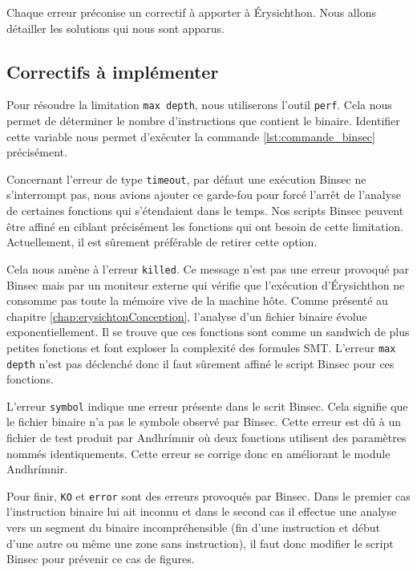 Chaque erreur préconise un correctif à apporter à Érysichthon. Nous allons détailler les solutions qui nous sont apparus.

\subsection*{Correctifs à implémenter}

Pour résoudre la limitation \texttt{max depth}, nous utiliserons l'outil \texttt{perf}. Cela nous permet de déterminer le nombre d'instructions que contient le binaire. Identifier cette variable nous permet d'exécuter la commande \ref{lst:commande_binsec} précisément.\smallbreak

Concernant l'erreur de type \texttt{timeout}, par défaut une exécution Binsec ne s'interrompt pas, nous avions ajouter ce garde-fou pour forcé l'arrêt de l'analyse de certaines fonctions qui s'étendaient dans le temps. Nos scripts Binsec peuvent être affiné en ciblant précisément les fonctions qui ont besoin de cette limitation. Actuellement, il est sûrement préférable de retirer cette option.\smallbreak

Cela nous amène à l'erreur \texttt{killed}. Ce message n'est pas une erreur provoqué par Binsec mais par un moniteur externe qui vérifie que l'exécution d'Érysichthon ne consomme pas toute la mémoire vive de la machine hôte. Comme présenté au chapitre \ref{chap:erysichtonConception}, l'analyse d'un fichier binaire évolue exponentiellement. Il se trouve que ces fonctions sont comme un sandwich de plus petites fonctions et font exploser la complexité des formules SMT. L'erreur \texttt{max depth} n'est pas déclenché donc il faut sûrement affiné le script Binsec pour ces fonctions.

L'erreur \texttt{symbol} indique une erreur présente dans le scrit Binsec. Cela signifie que le fichier binaire n'a pas le symbole observé par Binsec. Cette erreur est dû à un fichier de test produit par Andhrímnir où deux fonctions utilisent des paramètres nommés identiquements. Cette erreur se corrige donc en améliorant le module Andhrímnir.

Pour finir, \texttt{KO} et \texttt{error} sont des erreurs provoqués par Binsec. Dans le premier cas l'instruction binaire lui ait inconnu et dans le second cas il effectue une analyse vers un segment du binaire incompréhensible (fin d'une instruction et début d'une autre ou même une zone sans instruction), il faut donc modifier le script Binsec pour prévenir ce cas de figures.


